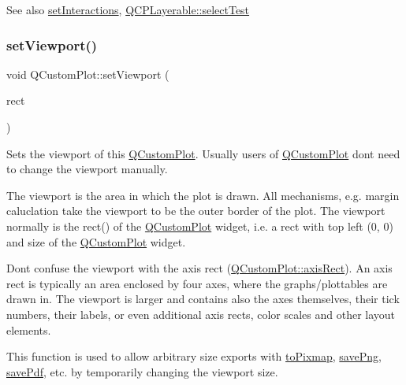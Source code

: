 \begin{DoxySeeAlso}{See also}
\hyperlink{classQCustomPlot_a5ee1e2f6ae27419deca53e75907c27e5}{set\+Interactions}, \hyperlink{classQCPLayerable_a04db8351fefd44cfdb77958e75c6288e}{Q\+C\+P\+Layerable\+::select\+Test} 
\end{DoxySeeAlso}
\mbox{\label{classQCustomPlot_a3f9bc4b939dd8aaba9339fd09f273fc4}} 
\subsubsection{\texorpdfstring{set\+Viewport()}{setViewport()}}
{\footnotesize\ttfamily void Q\+Custom\+Plot\+::set\+Viewport (\begin{DoxyParamCaption}\item[{const Q\+Rect \&}]{rect }\end{DoxyParamCaption})}

Sets the viewport of this \hyperlink{classQCustomPlot}{Q\+Custom\+Plot}. Usually users of \hyperlink{classQCustomPlot}{Q\+Custom\+Plot} don\textquotesingle{}t need to change the viewport manually.

The viewport is the area in which the plot is drawn. All mechanisms, e.\+g. margin caluclation take the viewport to be the outer border of the plot. The viewport normally is the rect() of the \hyperlink{classQCustomPlot}{Q\+Custom\+Plot} widget, i.\+e. a rect with top left (0, 0) and size of the \hyperlink{classQCustomPlot}{Q\+Custom\+Plot} widget.

Don\textquotesingle{}t confuse the viewport with the axis rect (\hyperlink{classQCustomPlot_ae5eefcb5f6ca26689b1fd4f6e25b42f9}{Q\+Custom\+Plot\+::axis\+Rect}). An axis rect is typically an area enclosed by four axes, where the graphs/plottables are drawn in. The viewport is larger and contains also the axes themselves, their tick numbers, their labels, or even additional axis rects, color scales and other layout elements.

This function is used to allow arbitrary size exports with \hyperlink{classQCustomPlot_aabb974d71ce96c137dc04eb6eab844fe}{to\+Pixmap}, \hyperlink{classQCustomPlot_ac92cc9256d12f354b40a4be4600b5fb9}{save\+Png}, \hyperlink{classQCustomPlot_ad5acd34f6b39c3516887d7e54fec2412}{save\+Pdf}, etc. by temporarily changing the viewport size. \mbox{\label{classQCustomPlot_a1be68d5c0f1e086d6374d1340a193fb9}} 
